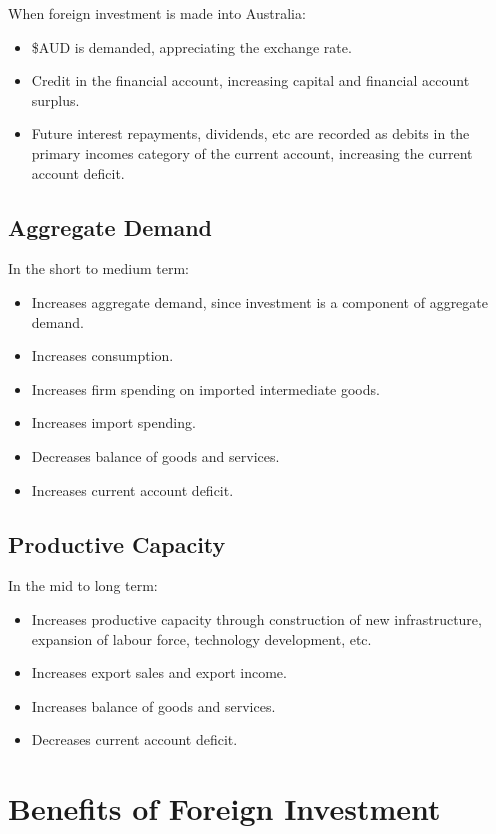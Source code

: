 \documentclass[a4paper,11pt]{article}
\begin{document}
When foreign investment is made into Australia:

\begin{itemize}
\item \$AUD is demanded, appreciating the exchange rate.
\item Credit in the financial account, increasing capital and financial account
	surplus.
\item Future interest repayments, dividends, etc are recorded as debits in the
	primary incomes category of the current account, increasing the current
	account deficit.
\end{itemize}


\subsection{Aggregate Demand}

In the short to medium term:

\begin{itemize}
\item Increases aggregate demand, since investment is a component of aggregate
	demand.
\item Increases consumption.
\item Increases firm spending on imported intermediate goods.
\item Increases import spending.
\item Decreases balance of goods and services.
\item Increases current account deficit.
\end{itemize}


\subsection{Productive Capacity}

In the mid to long term:

\begin{itemize}
\item Increases productive capacity through construction of new infrastructure,
	expansion of labour force, technology development, etc.
\item Increases export sales and export income.
\item Increases balance of goods and services.
\item Decreases current account deficit.
\end{itemize}




\section{Benefits of Foreign Investment}
\end{document}
